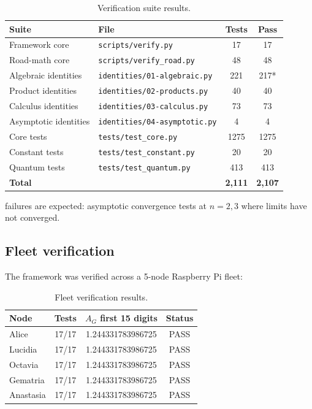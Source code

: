 \documentclass[11pt,a4paper]{article}
\theoremstyle{definition}
\theoremstyle{remark}
\newcommand{\AG}{A_G}
\begin{document}
\begin{table}[ht]
\centering
\caption{Verification suite results.}\label{tab:tests}
\begin{tabular}{llcc}
\toprule
Suite & File & Tests & Pass \\
\midrule
Framework core       & \texttt{scripts/verify.py}         & 17   & 17   \\
Road-math core       & \texttt{scripts/verify\_road.py}   & 48   & 48   \\
Algebraic identities & \texttt{identities/01-algebraic.py} & 221  & 217* \\
Product identities   & \texttt{identities/02-products.py}  & 40   & 40   \\
Calculus identities  & \texttt{identities/03-calculus.py}  & 73   & 73   \\
Asymptotic identities & \texttt{identities/04-asymptotic.py} & 4  & 4    \\
Core tests           & \texttt{tests/test\_core.py}        & 1275 & 1275 \\
Constant tests       & \texttt{tests/test\_constant.py}    & 20   & 20   \\
Quantum tests        & \texttt{tests/test\_quantum.py}     & 413  & 413  \\
\midrule
\textbf{Total}       &                                     & \textbf{2,111} & \textbf{2,107} \\
\bottomrule
\end{tabular}
\end{table}

 failures are expected: asymptotic convergence tests at $n=2,3$ where limits have not converged.

\subsection{Fleet verification}

The framework was verified across a 5-node Raspberry Pi fleet:

\begin{table}[ht]
\centering
\caption{Fleet verification results.}\label{tab:fleet}
\begin{tabular}{lccc}
\toprule
Node & Tests & $\AG$ first 15 digits & Status \\
\midrule
Alice     & 17/17 & 1.244331783986725 & PASS \\
Lucidia   & 17/17 & 1.244331783986725 & PASS \\
Octavia   & 17/17 & 1.244331783986725 & PASS \\
Gematria  & 17/17 & 1.244331783986725 & PASS \\
Anastasia & 17/17 & 1.244331783986725 & PASS \\
\bottomrule
\end{tabular}
\end{table}
\end{document}

